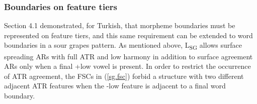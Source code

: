 \documentclass[,doc,floatsintext]{apa6}
\theoremstyle{definition}
\theoremstyle{definition}
\theoremstyle{definition}
\theoremstyle{remark}
\begin{document}
\subsubsection{Boundaries on feature
tiers}\label{boundaries-on-feature-tiers}

Section 4.1 demonstrated, for Turkish, that morpheme boundaries must be
represented on feature tiers, and this same requirement can be extended
to word boundaries in a sour grapes pattern. As mentioned above,
L\textsubscript{SG} allows surface spreading ARs with full ATR and low
harmony in addition to surface agreement ARs only when a final +low
vowel is present. In order to restrict the occurrence of ATR agreement,
the FSCs in (\ref{sg.fsc}) forbid a structure with two different
adjacent ATR features when the -low feature is adjacent to a final word
boundary.
\end{document}

